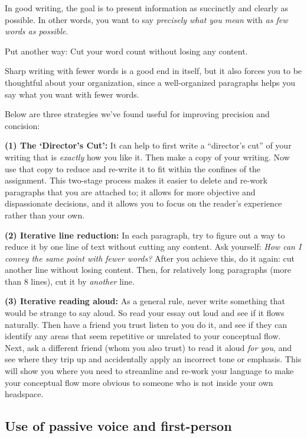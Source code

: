 \documentclass[
]{book}
\begin{document}
In good writing, the goal is to present information as succinctly and clearly as possible. In other words, you want to say \emph{precisely what you mean} with \emph{as few words as possible}.

Put another way: Cut your word count without losing any content.

Sharp writing with fewer words is a good end in itself, but it also forces you to be thoughtful about your organization, since a well-organized paragraphs helps you say what you want with fewer words.

Below are three strategies we've found useful for improving precision and concision:

\textbf{(1) The `Director's Cut':} It can help to first write a ``director's cut'' of your writing that is \emph{exactly} how you like it. Then make a copy of your writing. Now use that copy to reduce and re-write it to fit within the confines of the assignment. This two-stage process makes it easier to delete and re-work paragraphs that you are attached to; it allows for more objective and dispassionate decisions, and it allows you to focus on the reader's experience rather than your own.

\textbf{(2) Iterative line reduction:} In each paragraph, try to figure out a way to reduce it by one line of text without cutting any content. Ask yourself: \emph{How can I convey the same point with fewer words?} After you achieve this, do it again: cut another line without losing content. Then, for relatively long paragraphs (more than 8 lines), cut it by \emph{another} line.

\textbf{(3) Iterative reading aloud:} As a general rule, never write something that would be strange to say aloud. So read your essay out loud and see if it flows naturally. Then have a friend you trust listen to you do it, and see if they can identify any areas that seem repetitive or unrelated to your conceptual flow. Next, ask a different friend (whom you also trust) to read it aloud \emph{for you}, and see where they trip up and accidentally apply an incorrect tone or emphasis. This will show you where you need to streamline and re-work your language to make your conceptual flow more obvious to someone who is not inside your own headspace.

\hypertarget{use-of-passive-voice-and-first-person}{%
\subsection*{Use of passive voice and first-person}\label{use-of-passive-voice-and-first-person}}
\end{document}
